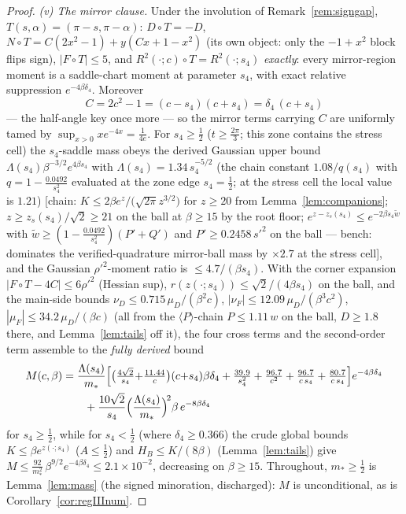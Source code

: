 \documentclass[11pt]{article}
\theoremstyle{remark}
\begin{document}
\begin{proof}
\emph{(v) The mirror clause.} Under the involution of
Remark~\ref{rem:signgap}, $T(s,\alpha)=(\pi-s,\pi-\alpha)$:
$D\circ T=-D$, $N\circ T=C(2x^2-1)+y(Cx+1-x^2)$ \textup{(}its own
object: only the $-1+x^2$ block flips sign\textup{)},
$|F\circ T|\le5$, and $R^2(\cdot;c)\circ T=R^2(\cdot;s_4)$
\emph{exactly}: every mirror-region moment is a saddle-chart moment
at parameter $s_4$, with exact relative suppression
$e^{-4\beta\delta_4}$. Moreover
\[
C=2c^2-1=(c-s_4)(c+s_4)=\delta_4\,(c+s_4)
\]
--- the half-angle key once more --- so the mirror terms carrying
$C$ are uniformly tamed by $\sup_{x>0}xe^{-4x}=\tfrac1{4e}$.
For $s_4\ge\tfrac12$ \textup{(}$t\ge\tfrac{2\pi}3$; this zone
contains the stress cell\textup{)} the $s_4$-saddle mass obeys the
derived Gaussian upper bound $\Lambda(s_4)\beta^{-3/2}e^{4\beta
s_4}$ with $\Lambda(s_4)=1.34\,s_4^{-5/2}$ \textup{(}the chain
constant $1.08/q(s_4)$ with $q=1-\tfrac{0.0492}{s_4^2}$ evaluated
at the zone edge $s_4=\tfrac12$; at the stress cell the local
value is $1.21$\textup{)}
\textup{[}chain: $K\le2\beta e^z/\bigl(\sqrt{2\pi}z^{3/2}\bigr)$
for $z\ge20$ from Lemma~\ref{lem:companions}; $z\ge
z_s(s_4)/\sqrt2\ge21$ on the ball at $\beta\ge15$ by the root
floor; $e^{z-z_s(s_4)}\le e^{-2\beta s_4\tilde w}$ with $\tilde
w\ge(1-\tfrac{0.0492}{s_4^2})(P'+Q')$ and $P'\ge0.2458\,s'^2$ on
the ball --- bench: dominates the verified-quadrature mirror-ball
mass by
$\times2.7$ at the stress cell\textup{]}, and the Gaussian
$\rho'^2$-moment ratio is $\le4.7/(\beta s_4)$. With the corner
expansion $|F\circ T-4C|\le6\rho'^2$ \textup{(}Hessian
sup\textup{)}, $r(z(\cdot;s_4))\le\sqrt2/(4\beta s_4)$ on the ball,
and the main-side bounds $\nu_D\le0.715\,\mu_D/(\beta^2c)$,
$|\nu_F|\le12.09\,\mu_D/(\beta^3c^2)$,
$|\mu_F|\le34.2\,\mu_D/(\beta c)$ \textup{(}all from the
$\langle P\rangle$-chain $P\le1.11\,w$ on the ball, $D\ge1.8$
there, and Lemma~\ref{lem:tails} off it\textup{)}, the four cross
terms and the second-order term assemble to the \emph{fully
derived} bound
\begin{align*}
M(c,\beta)&=\frac{\Lambda(s_4)}{m_*}\Bigl[
\bigl(\tfrac{4\sqrt2}{s_4}{+}\tfrac{11.44}{c}\bigr)(c{+}s_4)
\beta\delta_4
+\tfrac{39.9}{s_4^2}+\tfrac{96.7}{c^2}
+\tfrac{96.7}{c\,s_4}+\tfrac{80.7}{c\,s_4}
\Bigr]e^{-4\beta\delta_4}\\
&\qquad+\frac{10\sqrt2}{s_4}
\Bigl(\frac{\Lambda(s_4)}{m_*}\Bigr)^{\!2}\beta\,e^{-8\beta\delta_4}
\end{align*}
for $s_4\ge\tfrac12$, while for $s_4<\tfrac12$ \textup{(}where
$\delta_4\ge0.366$\textup{)} the crude global bounds $K\le\beta
e^{z(\cdot;s_4)}$ \textup{(}$A\le\tfrac12$\textup{)} and
$H_B\le K/(8\beta)$ \textup{(}Lemma~\ref{lem:tails}\textup{)} give
$M\le\tfrac{92}{m_*^2}\,\beta^{9/2}e^{-4\beta\delta_4}
\le2.1\times10^{-2}$, decreasing on $\beta\ge15$. Throughout,
$m_*\ge\tfrac12$ is Lemma~\ref{lem:mass} \textup{(}the signed
minoration, discharged\textup{)}: $M$ is unconditional, as is
Corollary~\ref{cor:regIIInum}.
\end{proof}
\end{document}
